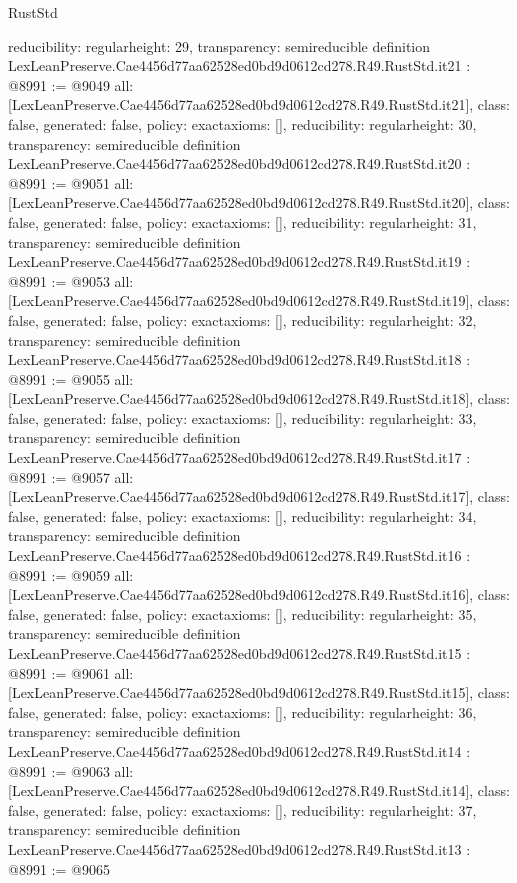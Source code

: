 \begin{lexlean}{RustStd}
\begin{coremodule}
{  reducibility: regular{height: 29},
  transparency: semireducible
}
definition LexLeanPreserve.Cae4456d77aa62528ed0bd9d0612cd278.R49.RustStd.it21 : @8991 := @9049 {
  all: [LexLeanPreserve.Cae4456d77aa62528ed0bd9d0612cd278.R49.RustStd.it21],
  class: false,
  generated: false,
  policy: exact{axioms: []},
  reducibility: regular{height: 30},
  transparency: semireducible
}
definition LexLeanPreserve.Cae4456d77aa62528ed0bd9d0612cd278.R49.RustStd.it20 : @8991 := @9051 {
  all: [LexLeanPreserve.Cae4456d77aa62528ed0bd9d0612cd278.R49.RustStd.it20],
  class: false,
  generated: false,
  policy: exact{axioms: []},
  reducibility: regular{height: 31},
  transparency: semireducible
}
definition LexLeanPreserve.Cae4456d77aa62528ed0bd9d0612cd278.R49.RustStd.it19 : @8991 := @9053 {
  all: [LexLeanPreserve.Cae4456d77aa62528ed0bd9d0612cd278.R49.RustStd.it19],
  class: false,
  generated: false,
  policy: exact{axioms: []},
  reducibility: regular{height: 32},
  transparency: semireducible
}
definition LexLeanPreserve.Cae4456d77aa62528ed0bd9d0612cd278.R49.RustStd.it18 : @8991 := @9055 {
  all: [LexLeanPreserve.Cae4456d77aa62528ed0bd9d0612cd278.R49.RustStd.it18],
  class: false,
  generated: false,
  policy: exact{axioms: []},
  reducibility: regular{height: 33},
  transparency: semireducible
}
definition LexLeanPreserve.Cae4456d77aa62528ed0bd9d0612cd278.R49.RustStd.it17 : @8991 := @9057 {
  all: [LexLeanPreserve.Cae4456d77aa62528ed0bd9d0612cd278.R49.RustStd.it17],
  class: false,
  generated: false,
  policy: exact{axioms: []},
  reducibility: regular{height: 34},
  transparency: semireducible
}
definition LexLeanPreserve.Cae4456d77aa62528ed0bd9d0612cd278.R49.RustStd.it16 : @8991 := @9059 {
  all: [LexLeanPreserve.Cae4456d77aa62528ed0bd9d0612cd278.R49.RustStd.it16],
  class: false,
  generated: false,
  policy: exact{axioms: []},
  reducibility: regular{height: 35},
  transparency: semireducible
}
definition LexLeanPreserve.Cae4456d77aa62528ed0bd9d0612cd278.R49.RustStd.it15 : @8991 := @9061 {
  all: [LexLeanPreserve.Cae4456d77aa62528ed0bd9d0612cd278.R49.RustStd.it15],
  class: false,
  generated: false,
  policy: exact{axioms: []},
  reducibility: regular{height: 36},
  transparency: semireducible
}
definition LexLeanPreserve.Cae4456d77aa62528ed0bd9d0612cd278.R49.RustStd.it14 : @8991 := @9063 {
  all: [LexLeanPreserve.Cae4456d77aa62528ed0bd9d0612cd278.R49.RustStd.it14],
  class: false,
  generated: false,
  policy: exact{axioms: []},
  reducibility: regular{height: 37},
  transparency: semireducible
}
definition LexLeanPreserve.Cae4456d77aa62528ed0bd9d0612cd278.R49.RustStd.it13 : @8991 := @9065 {
}
\end{coremodule}
\end{lexlean}
